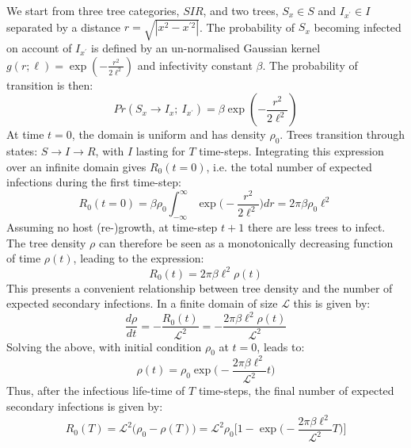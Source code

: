 \begin{fi}
\label{section:apendix_A}
We start from three tree categories, $SIR$, and two trees, $S_x\in S$ and $I_{x^\prime}\in I$ separated by a distance $r=\sqrt{|x^2-x^{\prime 2}|}$. The probability of $S_x$ becoming infected on account of $I_{x^\prime}$ is defined by an un-normalised Gaussian kernel $g(r; \ell) = \exp(-\frac{r^2}{2\ell^2})$ and infectivity constant $\beta$. The probability of transition is then:
\begin{equation}
\label{eq:Appendix_pr_trans}
     Pr(S_x\rightarrow I_x;\ I_{x^\prime}) = \beta \exp(-\frac{r^2}{2\ell^2})
\end{equation}
At time $t=0$, the domain is uniform and has density $\rho_0$. Trees transition through states: $S\rightarrow I\rightarrow R$, with $I$ lasting for $T$ time-steps. Integrating this expression over an infinite domain gives $R_0(t=0)$, i.e. the total number of expected infections during the first time-step:
\begin{equation}
    R_0(t = 0) = \beta \rho_0 \int^{\infty}_{-\infty} \exp\Big(-\frac{r^2}{2\ell^2}\Big)dr= 2\pi\beta\rho_0\ell^2
\end{equation}{} 
Assuming no host (re-)growth, at time-step $t+1$ there are less trees to infect. The tree density $\rho$ can therefore be seen as a monotonically decreasing function of time $\rho(t)$, leading to the expression:
\begin{equation}
    R_0(t) = 2\pi\beta\ell^2\rho(t)
    \label{eq:r0-A}
\end{equation}{}
This presents a convenient relationship between tree density and the number of expected secondary infections. In a finite domain of size $\mathcal{L}$ this is given by:
\begin{equation}
    \frac{d\rho}{dt} = - \frac{R_0(t)}{\mathcal{L}^2} = -\frac{2\pi\beta\ell^2\rho(t)}{\mathcal{L}^2}
\end{equation}
Solving the above, with initial condition $\rho_0$ at $t=0$, leads to:
\begin{equation}
    \rho(t) = \rho_0 \exp\Big(-\frac{2\pi\beta\ell^2}{\mathcal{L}^2} t \Big)
\end{equation}
Thus, after the infectious life-time of $T$ time-steps, the final number of expected secondary infections is given by:
\begin{equation}
\label{eq:Appendix_final_r0_approx}
    R_0(T) =  \mathcal{L}^2\big(\rho_0 - \rho(T)\big) = \mathcal{L}^2\rho_0\Big[1 - \exp\big(-\frac{2\pi\beta\ell^2}{\mathcal{L}^2} T \big) \Big]
\end{equation}

\end{fi}
